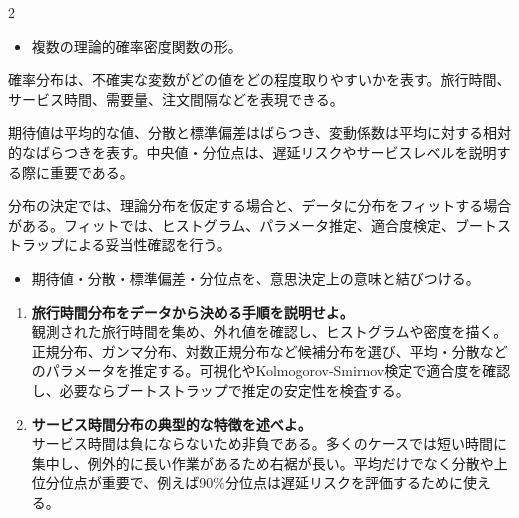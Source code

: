 \clearpage
{}
\begin{multicols}{2}\footnotesize\raggedcolumns
{}
\begin{itemize}
\item 複数の理論的確率密度関数の形。
\end{itemize}
確率分布は、不確実な変数がどの値をどの程度取りやすいかを表す。旅行時間、サービス時間、需要量、注文間隔などを表現できる。\par

期待値は平均的な値、分散と標準偏差はばらつき、変動係数は平均に対する相対的なばらつきを表す。中央値・分位点は、遅延リスクやサービスレベルを説明する際に重要である。\par

分布の決定では、理論分布を仮定する場合と、データに分布をフィットする場合がある。フィットでは、ヒストグラム、パラメータ推定、適合度検定、ブートストラップによる妥当性確認を行う。\par
{}
\begin{itemize}
\item 期待値・分散・標準偏差・分位点を、意思決定上の意味と結びつける。
\end{itemize}
\begin{enumerate}
\item \textbf{旅行時間分布をデータから決める手順を説明せよ。}\\観測された旅行時間を集め、外れ値を確認し、ヒストグラムや密度を描く。正規分布、ガンマ分布、対数正規分布など候補分布を選び、平均・分散などのパラメータを推定する。可視化やKolmogorov-Smirnov検定で適合度を確認し、必要ならブートストラップで推定の安定性を検査する。
\item \textbf{サービス時間分布の典型的な特徴を述べよ。}\\サービス時間は負にならないため非負である。多くのケースでは短い時間に集中し、例外的に長い作業があるため右裾が長い。平均だけでなく分散や上位分位点が重要で、例えば90\%分位点は遅延リスクを評価するために使える。
\end{enumerate}
\end{multicols}

